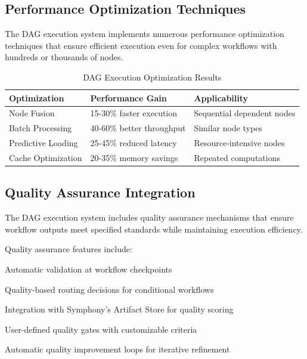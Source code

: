 \subsection*{Performance Optimization Techniques}

The DAG execution system implements numerous performance optimization techniques that ensure efficient execution even for complex workflows with hundreds or thousands of nodes.

\begin{table}[ht]
\centering
\begin{tabular}{@{}lll@{}}
\toprule
\textbf{Optimization} & \textbf{Performance Gain} & \textbf{Applicability} \\
\midrule
Node Fusion & 15-30\% faster execution & Sequential dependent nodes \\
Batch Processing & 40-60\% better throughput & Similar node types \\
Predictive Loading & 25-45\% reduced latency & Resource-intensive nodes \\
Cache Optimization & 20-35\% memory savings & Repeated computations \\
\bottomrule
\end{tabular}
\caption{DAG Execution Optimization Results}
\end{table}

\subsection*{Quality Assurance Integration}

The DAG execution system includes quality assurance mechanisms that ensure workflow outputs meet specified standards while maintaining execution efficiency.

Quality assurance features include:

\begin{compactlist}
    \item Automatic validation at workflow checkpoints
    \item Quality-based routing decisions for conditional workflows
    \item Integration with Symphony's Artifact Store for quality scoring
    \item User-defined quality gates with customizable criteria
    \item Automatic quality improvement loops for iterative refinement
\end{compactlist}

